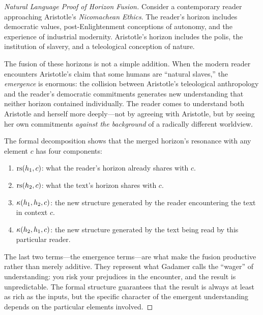 \begin{proof}[Natural Language Proof of Horizon Fusion]
Consider a contemporary reader approaching Aristotle's \textit{Nicomachean
Ethics}.  The reader's horizon includes democratic values, post-Enlightenment
conceptions of autonomy, and the experience of industrial modernity.
Aristotle's horizon includes the polis, the institution of slavery, and a
teleological conception of nature.

The fusion of these horizons is not a simple addition.  When the modern reader
encounters Aristotle's claim that some humans are ``natural slaves,'' the
\emph{emergence} is enormous: the collision between Aristotle's teleological
anthropology and the reader's democratic commitments generates new
understanding that neither horizon contained individually.  The reader comes
to understand both Aristotle and herself more deeply---not by agreeing with
Aristotle, but by seeing her own commitments \emph{against the background} of
a radically different worldview.

The formal decomposition shows that the merged horizon's resonance with any
element $c$ has four components:
\begin{enumerate}
\item $\mathrm{rs}(h_1, c)$: what the reader's horizon already shares with $c$.
\item $\mathrm{rs}(h_2, c)$: what the text's horizon shares with $c$.
\item $\kappa(h_1, h_2, c)$: the new structure generated by the reader
encountering the text in context $c$.
\item $\kappa(h_2, h_1, c)$: the new structure generated by the text
being read by this particular reader.
\end{enumerate}

The last two terms---the emergence terms---are what make the fusion productive
rather than merely additive.  They represent what Gadamer calls the ``wager''
of understanding: you risk your prejudices in the encounter, and the result
is unpredictable.  The formal structure guarantees that the result is always
at least as rich as the inputs, but the specific character of the emergent
understanding depends on the particular elements involved.
\end{proof}

